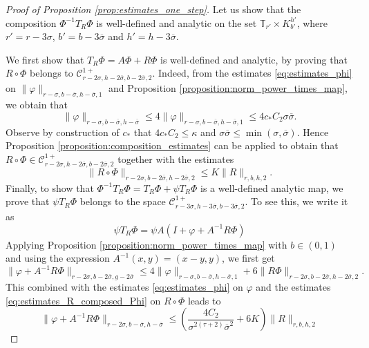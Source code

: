 \documentclass[10pt]{article}
\newcommand{\T}{\mathbb{T}}
\begin{document}
\begin{proof}[Proof of Proposition \ref{prop:estimates_one_step}]
Let us show that the composition $\Phi^{-1}T_R\Phi$ is well-defined and analytic on the set $\T_{r'}\times K^{h'}_{b'}$, where $r'=r - 3\sigma$, $b'=b-3\overline\sigma$ and $h'=h-3\overline\sigma$.

We first show that $T_R\Phi = A \Phi + R \Phi$ is well-defined and analytic, by proving that $R\circ \Phi$ belongs to $\mathscr C^{1+}_{r-2\sigma,h-2\overline\sigma,b-2\overline\sigma,2}$. Indeed, from the estimates \eqref{eq:estimates_phi} on $\|\varphi\|_{r-\sigma,b-\overline\sigma,h-\overline\sigma,1}$ and Proposition \ref{proposition:norm_power_times_map}, we obtain that
\begin{equation}
\label{eq:estimates_phi_2}
\|\varphi\|_{r-\sigma,b-\overline\sigma,h-\overline\sigma}
\leq 
4\|\varphi\|_{r-\sigma,b-\overline\sigma,h-\overline\sigma,1}
\leq
4c_\ast C_2
\sigma\overline\sigma.
\end{equation}
Observe by construction of $c_\ast$ that $4c_\ast C_2\leq\kappa$ and $\sigma\overline\sigma\leq \min(\sigma,\overline\sigma)$. Hence Proposition \ref{proposition:composition_estimates} can be applied to obtain that $R\circ \Phi\in\mathscr C^{1+}_{r-2\sigma,h-2\overline\sigma,b-2\overline\sigma,2}$
together with the estimates
\begin{equation}
    \label{eq:estimates_R_composed_Phi}
\|R\circ\Phi\|_{r-2\sigma,b-2\overline\sigma,h-2\overline\sigma,2}\leq K\|R\|_{r,b,h,2}.
\end{equation}
Finally, to show that $\Phi^{-1}T_R\Phi = T_R  \Phi + \psi T_R \Phi$
is a well-defined analytic map, we prove that $\psi T_R\Phi$ belongs to the space 
$\mathscr C^{1+}_{r-3\sigma,h-3\overline\sigma,b-3\overline\sigma,2}$. To see this, we write it as
\[
\psi T_R\Phi = \psi A(I+\varphi+A^{-1}R\Phi)
\]
Applying Proposition \ref{proposition:norm_power_times_map} with $b\in(0,1)$ and using the expression $A^{-1}(x,y)=(x-y,y)$, we first get
\[
\|\varphi+A^{-1}R\Phi\|_{r - 2\sigma, b - 2\overline \sigma, g - 2\overline \sigma}
\leq 
4\|\varphi\|_{r-\sigma,b-\overline\sigma,h-\overline\sigma,1}
+
6\|R\Phi\|_{r-2\sigma,b-2\overline\sigma,h-2\overline\sigma,2}.
\]
This combined with the estimates \eqref{eq:estimates_phi} on $\varphi$ and the estimates \eqref{eq:estimates_R_composed_Phi} on $R\circ\Phi$ leads to
\begin{equation}
\label{eq:phi_plus_R}
\|\varphi+A^{-1}R\Phi\|_{r - 2\sigma, b - \overline \sigma, h - \overline \sigma}
\leq 
\left(\frac{4C_2}{\sigma^{2(\tau+2)}\overline\sigma^2}
+6K\right)\|R\|_{r,b,h,2}

\end{equation}
\end{proof}
\end{document}
